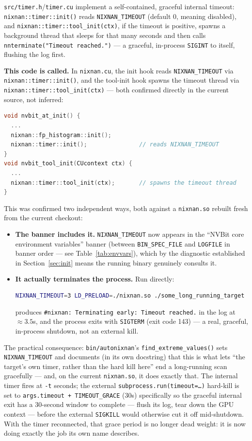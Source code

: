 \documentclass[11pt]{article}
\begin{document}
\texttt{src/timer.h}/\texttt{timer.cu} implement a self-contained,
graceful internal timeout: \texttt{nixnan::timer::init()} reads
\texttt{NIXNAN\_TIMEOUT} (default 0, meaning disabled), and
\texttt{nixnan::timer::tool\_init(ctx)}, if the timeout is positive,
spawns a background thread that sleeps for that many seconds and then
calls \texttt{nnterminate("Timeout reached.")} --- a graceful,
in-process \texttt{SIGINT} to itself, flushing the log first.

\textbf{This code is called.} In \texttt{nixnan.cu}, the
init hook reads \texttt{NIXNAN\_TIMEOUT} via
\texttt{nixnan::timer::init()}, and the tool-init hook spawns the
timeout thread via \texttt{nixnan::timer::tool\_init(ctx)} --- both
confirmed directly in the current source, not inferred:
\begin{lstlisting}[language=C++]
void nvbit_at_init() {
  ...
  nixnan::fp_histogram::init();
  nixnan::timer::init();               // reads NIXNAN_TIMEOUT
}
void nvbit_tool_init(CUcontext ctx) {
  ...
  nixnan::timer::tool_init(ctx);       // spawns the timeout thread
}
\end{lstlisting}
This was confirmed two independent ways, both against a \texttt{nixnan.so}
rebuilt fresh from the current checkout:
\begin{itemize}
\item \textbf{The banner includes it.} \texttt{NIXNAN\_TIMEOUT} now
  appears in the ``NVBit core environment variables'' banner (between
  \texttt{BIN\_SPEC\_FILE} and \texttt{LOGFILE} in banner order --- see
  Table~\ref{tab:envvars}), which by the diagnostic established in
  Section~\ref{sec:init} means the running binary genuinely consults it.
\item \textbf{It actually terminates the process.} Run directly:
\begin{lstlisting}[language=bash]
NIXNAN_TIMEOUT=3 LD_PRELOAD=./nixnan.so ./some_long_running_target
\end{lstlisting}
produces \texttt{\#nixnan: Terminating early: Timeout reached.} in the
log at $\approx\!3.5$s, and the process exits with \texttt{SIGTERM}
(exit code 143) --- a real, graceful, in-process shutdown, not an
external kill.
\end{itemize}

The practical consequence: \texttt{bin/autonixnan}'s
\texttt{find\_extreme\_values()} sets \texttt{NIXNAN\_TIMEOUT} and
documents (in its own docstring) that this is what lets ``the target's
own timer, rather than the hard kill here'' end a long-running scan
gracefully --- and, on the current \texttt{nixnan.so}, it does exactly
that. The internal timer fires at \texttt{-t} seconds; the external
\texttt{subprocess.run(timeout=\ldots)} hard-kill is set to
\texttt{args.timeout + TIMEOUT\_GRACE} (30s) specifically so the graceful
internal exit has a 30-second window to complete --- flush its log,
tear down the GPU context --- before the external \texttt{SIGKILL} would
otherwise cut it off mid-shutdown. With the timer reconnected, that grace
period is no longer dead weight: it is now doing exactly the job its own
name describes.
\end{document}
